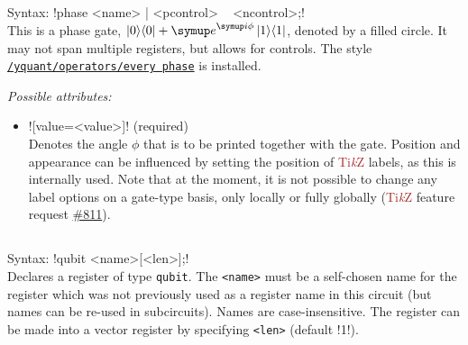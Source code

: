 \documentclass{scrartcl}
\def\TikZ{\textcolor{brown}{Ti\textit kZ}}
\def\style#1{\hyperref[style:#1]{\texttt{#1}}}
\def\ii{{\symup i}}
\def\ee{{\symup e}}
\def\ketbra#1#2{\ket{#1}\!\bra{#2}}
\begin{document}
      \subsection{\texorpdfstring{}{phase}}\label{gate:phase}
         Syntax: \yquant!phase <name> | <pcontrol> ~ <ncontrol>;! \\
         This is a phase gate, $\ketbra00 + \ee^{\ii\phi} \ketbra11$, denoted by a filled circle.
         It may not span multiple registers, but allows for controls.
         The style \style{/yquant/operators/every phase} is installed.

         \emph{Possible attributes:}
         \begin{itemize}
            \item \yquant![value=<value>]! (required) \\
               Denotes the angle $\phi$ that is to be printed together with the gate.
               Position and appearance can be influenced by setting the position of \TikZ{} labels, as this is internally used.
               Note that at the moment, it is not possible to change any label options on a gate\hyp type basis, only locally or fully globally (\TikZ{} feature request \href{https://github.com/pgf-tikz/pgf/issues/811}{\#811}).
         \end{itemize}

      \subsection{\texorpdfstring{}{qubit}}\label{gate:qubit}
         Syntax: \yquant!qubit <name>[<len>];! \\
         Declares a register of type \texttt{qubit}.
         The \texttt{<name>} must be a self\hyp chosen name for the register which was not previously used as a register name in this circuit (but names can be re\hyp used in subcircuits).
         Names are case\hyp insensitive.
         The register can be made into a vector register by specifying \texttt{<len>} (default \tex!1!).
\end{document}
